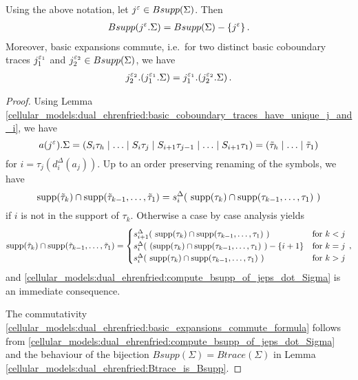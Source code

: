 \begin{prop}
    \label{cellular_models:dual_ehrenfried:basic_expansions_commute}
    Using the above notation, let $j^\varepsilon \in Bsupp(\Sigma)$.
    Then
    \begin{align}
        \label{cellular_models:dual_ehrenfried:compute_bsupp_of_jeps_dot_Sigma}
        Bsupp(j^\eps.\Sigma) = Bsupp(\Sigma) - \{ j^\eps \} \,.
    \end{align}
    Moreover, basic expansions commute, i.e.\ for two distinct basic coboundary traces $j_1^{\varepsilon_1}$ and $j_2^{\varepsilon_2} \in Bsupp(\Sigma)$, we have
    \begin{align}
        \label{cellular_models:dual_ehrenfried:basic_expansions_commute_formula}
        j_2^{\eps_2}.( j_1^{\eps_1}.\Sigma ) = j_1^{\eps_1}.( j_2^{\eps_2}.\Sigma ) \,.
    \end{align}
\end{prop}

\begin{proof}
    Using Lemma \ref{cellular_models:dual_ehrenfried:basic_coboundary_traces_have_unique_j_and_i}, we have
    \[
        a(j^\eps).\Sigma = (S_i\tau_h \mid \ldots \mid S_i\tau_j \mid S_{i+1}\tau_{j-1} \mid \ldots \mid S_{i+1}\tau_1) = \inhom[\tilde\tau]
    \]
    for $i = \tau_j( d_i^\Delta(a_j) )$.
    Up to an order preserving renaming of the symbols, we have
    \[
        \supp(\tilde\tau_k) \cap \supp(\tilde\tau_{k-1}, \ldots, \tilde\tau_1) = s_i^\Delta(\ \supp(\tau_k) \cap \supp(\tau_{k-1}, \ldots, \tau_1)\ )
    \]
    if $i$ is not in the support of $\tau_k$.
    Otherwise a case by case analysis yields
    \[
        \supp(\tilde\tau_k) \cap \supp(\tilde\tau_{k-1}, \ldots, \tilde\tau_1) =
            \begin{cases}
                s_{i+1}^\Delta(\ \supp(\tau_k) \cap \supp(\tau_{k-1}, \ldots, \tau_1) \ ) & \text{for } k < j \\
                s_{i}^\Delta(\ (\supp(\tau_k) \cap \supp(\tau_{k-1}, \ldots, \tau_1) \ ) - \{ i + 1\} & \text{for } k = j \\
                s_{i}^\Delta(\ \supp(\tau_k) \cap \supp(\tau_{k-1}, \ldots, \tau_1) \ ) & \text{for } k > j 
            \end{cases} \,,
    \]
    and \eqref{cellular_models:dual_ehrenfried:compute_bsupp_of_jeps_dot_Sigma} is an immediate consequence.
    
    The commutativity \eqref{cellular_models:dual_ehrenfried:basic_expansions_commute_formula} follows from
    \eqref{cellular_models:dual_ehrenfried:compute_bsupp_of_jeps_dot_Sigma} and
    the behaviour of the bijection $Bsupp(\Sigma) = Btrace(\Sigma)$ in Lemma \ref{cellular_models:dual_ehrenfried:Btrace_is_Bsupp}.
\end{proof}

